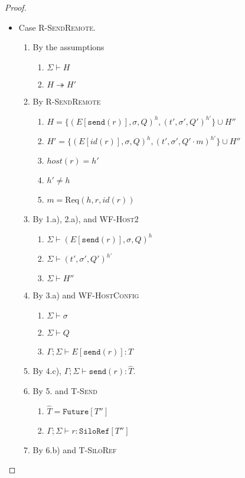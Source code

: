 \documentclass{article}
\theoremstyle{definition}
\newcommand{\Req}[3]{\text{Req}(#1, #2, #3)}
\begin{document}
\begin{proof}
\begin{itemize}
\item Case \textsc{R-SendRemote}.
\begin{enumerate}
\item By the assumptions
  \begin{enumerate}[label=(\alph*)]
  \item $\Sigma \vdash H$
  \item $H \twoheadrightarrow H'$
  \end{enumerate}
\item By \textsc{R-SendRemote}
  \begin{enumerate}[label=(\alph*)]
  \item $H = \{ (E[\texttt{send}(r)], \sigma, Q)^h, (t', \sigma', Q')^{h'} \} \cup H''$
  \item $H' = \{ (E[id(r)], \sigma, Q)^h, (t', \sigma', Q' \cdot m)^{h'} \} \cup H''$
  \item $host(r) = h'$
  \item $h' \neq h$
  \item $m = {\Req h r {id(r)}}$  %
  \end{enumerate}
\item By 1.a), 2.a), and \textsc{WF-Host2}
  \begin{enumerate}[label=(\alph*)]
  \item $\Sigma \vdash (E[\texttt{send}(r)], \sigma, Q)^h$ 
  \item $\Sigma \vdash (t', \sigma', Q')^{h'}$
  \item $\Sigma \vdash H''$
  \end{enumerate}
\item By 3.a) and \textsc{WF-HostConfig}
  \begin{enumerate}[label=(\alph*)]
  \item $\Sigma \vdash \sigma$
  \item $\Sigma \vdash Q$
  \item $\Gamma ; \Sigma \vdash E[\texttt{send}(r)] : T$
  \end{enumerate}
\item By 4.c), $\Gamma ; \Sigma \vdash \texttt{send}(r) : \hat{T}$.
\item By 5. and \textsc{T-Send}
  \begin{enumerate}[label=(\alph*)]
  \item $\hat{T} = \texttt{Future}[T'']$
  \item $\Gamma ; \Sigma \vdash r : \texttt{SiloRef}[T'']$
  \end{enumerate}
\item By 6.b) and \textsc{T-SiloRef}

\end{enumerate}
\end{itemize}
\end{proof}
\end{document}
